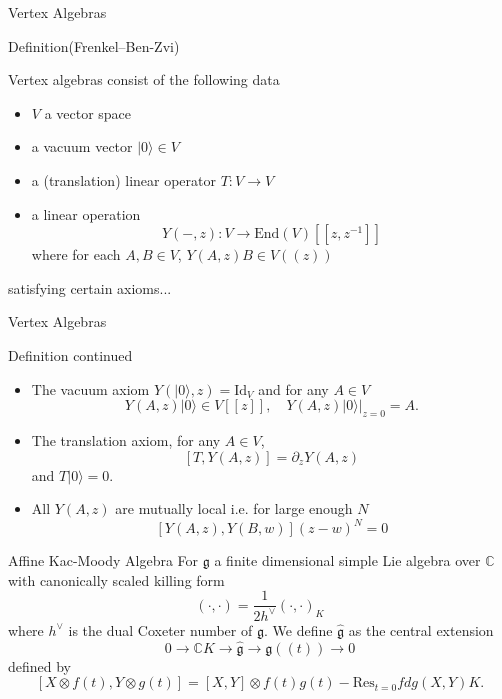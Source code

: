 \documentclass{beamer}
\newcommand{\vac}{|0\rangle}
\newcommand{\C}{\mathbb{C}}
\newcommand{\Z}{\mathbb{Z}}
\begin{document}
\begin{frame}{Vertex Algebras}
    \begin{block}{Definition}(Frenkel--Ben-Zvi)

        Vertex algebras consist of the following data
        \begin{itemize}
            \item $V$ a vector space
            \item a vacuum vector $|0\rangle \in V$
            \item a (translation) linear operator $T:V\to V$
            \item a linear operation
                  \[
                      Y(-,z):V \to \mbox{End}(V)[[z,z^{-1}]]
                  \]
                  where for each $A,B \in V$,  $Y(A,z)B\in V((z))$
        \end{itemize}
        satisfying certain axioms...
    \end{block}
\end{frame}

\begin{frame}{Vertex Algebras}
    \begin{block}{Definition continued}
        \begin{itemize}
            \item The vacuum axiom $Y(\vac,z) = \mbox{Id}_V$ and for any $A\in V$
                  \[
                      Y(A,z)\vac \in V[[z]], \quad Y(A,z)\vac|_{z=0}=A.
                  \]
            \item The translation axiom, for any $A\in V$,
                  \[
                      [T,Y(A,z)]=\partial_z Y(A,z)
                  \]
                  and $T\vac =0$.
            \item All $Y(A,z)$ are mutually local i.e. for large enough $N$
                  \[
                      [Y(A,z),Y(B,w)](z-w)^N =0
                  \]
        \end{itemize}
    \end{block}
\end{frame}

\begin{frame}{Affine Kac-Moody Algebra}
    For $\mathfrak{g}$ a finite dimensional simple Lie algebra over $\C$ with canonically scaled killing form
    \[
        (\cdot, \cdot) = \frac{1}{{2h^{\vee}}}(\cdot,\cdot)_{K}
    \]
    where $h^{\vee}$ is the dual Coxeter number of $\mathfrak{g}$. We define $\hat{\mathfrak{g}}$ as the central extension
    \[
        0 \to \C K \to \hat{\mathfrak{g}} \to \mathfrak{g}((t)) \to 0
    \]
    defined by
    \[
        [X\otimes f(t),Y \otimes g(t)]=[X,Y]\otimes f(t)g(t) -\mbox{Res}_{t=0} f dg(X,Y) K.
    \]
\end{frame}
\end{document}

